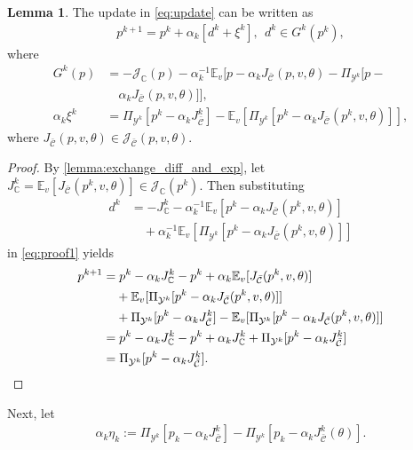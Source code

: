 \documentclass[journal,twoside,web,final]{ieeecolor}
\theoremstyle{definition}
\newtheorem{lemma}{Lemma}
\newcommand{\J}{\mathcal{J}}
\newcommand{\E}{\mathbb{E}}
\newcommand{\C}{\mathbb{C}}
\newcommand{\Cb}{{\bar{\mathcal{C}}}}
\begin{document}
\begin{lemma}
The update in \cref{eq:update} can be written as
\begin{align}\label{eq:proof1}
p^{k+1}= p^k+\alpha_k [d^k + \xi^k],~~ d^k\in G^k(p^k),
\end{align}
where
\begin{align*}
G^k(p) & = - \J_{\C}(p) - \alpha_k^{-1}\E_v[p-\alpha_k J_\Cb(p,v,\theta) - \Pi_{\mathcal{Y}^k}[p - \\ & \quad \alpha_k J_\Cb(p,v,\theta)]],\\
\alpha_k \xi^k & = \Pi_{\mathcal{Y}^k}[p^k-\alpha_k J_\Cb^k] - \E_v[\Pi_{\mathcal{Y}^k}[p^k-\alpha_k J_\Cb(p^k,v,\theta)]],
\end{align*}
where $J_\Cb(p,v,\theta)\in\J_\Cb(p,v,\theta)$.
\end{lemma}

\begin{proof}
By \cref{lemma:exchange_diff_and_exp}, let $J_\C^k = \mathbb{E}_v[J_\Cb(p^k,v,\theta)] \in \J_\C(p^k)$. Then substituting
\begin{align*}
d^k & = - J_\C^k-\alpha_k^{-1}\E_v[p^k-\alpha_k J_\Cb(p^k,v,\theta)] \\ & \quad + \alpha_k^{-1}\E_v[\Pi_{\mathcal{Y}^k}[p^k - \alpha_k J_\Cb(p^k,v,\theta)]]
\end{align*}
in \cref{eq:proof1} yields
\begin{align*}
p^{k+1} & =  p^k - \alpha_k J_\C^k - p^k + \alpha_k \E_v[J_\Cb(p^k,v,\theta)] \\ & \hphantom{={}} + \E_v[\Pi_{\mathcal{Y}^k}[p^k-\alpha_k J_\Cb(p^k,v,\theta)]] \\ & \hphantom{={}} + \Pi_{\mathcal{Y}^k}[p^k-\alpha_k J_\Cb^k] - \E_v[\Pi_{\mathcal{Y}^k}[p^k-\alpha_k J_\Cb(p^k,v,\theta)]] \\
%
& = p^k - \alpha_k J_\C^k - p^k + \alpha_k J_\C^k + \Pi_{\mathcal{Y}^k}[p^k-\alpha_k J_\Cb^k] \\
%
& = \Pi_{\mathcal{Y}^k}[p^k-\alpha_k J_\Cb^k ].\qedhere
\end{align*}
\end{proof}

\noindent Next, let
\begin{align*}
\alpha_k\eta_k:=\Pi_{\mathcal{Y}^k}[p_k-\alpha_k J_\Cb^k] - \Pi_{\mathcal{Y}^k}[p_k-\alpha_k J_\Cb^k(\theta)].
\end{align*}
\end{document}
